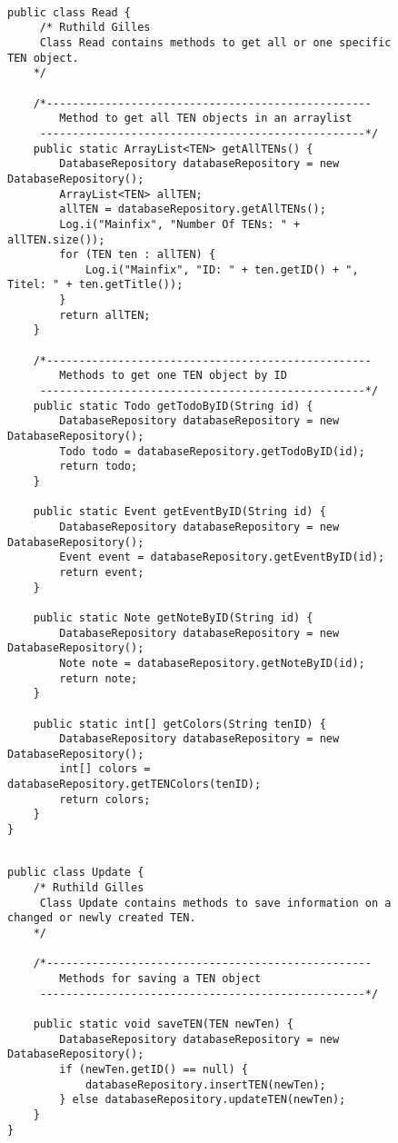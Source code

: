 \begin{figure}[H]
\begin{lstlisting}[caption=Read (Ruthild Gilles)]

public class Read {
     /* Ruthild Gilles
     Class Read contains methods to get all or one specific TEN object.
    */

    /*--------------------------------------------------
        Method to get all TEN objects in an arraylist
     --------------------------------------------------*/
    public static ArrayList<TEN> getAllTENs() {
        DatabaseRepository databaseRepository = new DatabaseRepository();
        ArrayList<TEN> allTEN;
        allTEN = databaseRepository.getAllTENs();
        Log.i("Mainfix", "Number Of TENs: " + allTEN.size());
        for (TEN ten : allTEN) {
            Log.i("Mainfix", "ID: " + ten.getID() + ", Titel: " + ten.getTitle());
        }
        return allTEN;
    }

    /*--------------------------------------------------
        Methods to get one TEN object by ID
     --------------------------------------------------*/
    public static Todo getTodoByID(String id) {
        DatabaseRepository databaseRepository = new DatabaseRepository();
        Todo todo = databaseRepository.getTodoByID(id);
        return todo;
    }

    public static Event getEventByID(String id) {
        DatabaseRepository databaseRepository = new DatabaseRepository();
        Event event = databaseRepository.getEventByID(id);
        return event;
    }

    public static Note getNoteByID(String id) {
        DatabaseRepository databaseRepository = new DatabaseRepository();
        Note note = databaseRepository.getNoteByID(id);
        return note;
    }

    public static int[] getColors(String tenID) {
        DatabaseRepository databaseRepository = new DatabaseRepository();
        int[] colors = databaseRepository.getTENColors(tenID);
        return colors;
    }
}
\end{lstlisting}
\end{figure}

\begin{figure}[H]
\begin{lstlisting}[caption=Update (Ruthild Gilles)]

public class Update {
    /* Ruthild Gilles
     Class Update contains methods to save information on a changed or newly created TEN.
    */

    /*--------------------------------------------------
        Methods for saving a TEN object
     --------------------------------------------------*/

    public static void saveTEN(TEN newTen) {
        DatabaseRepository databaseRepository = new DatabaseRepository();
        if (newTen.getID() == null) {
            databaseRepository.insertTEN(newTen);
        } else databaseRepository.updateTEN(newTen);
    }
}
\end{lstlisting}
\end{figure}

